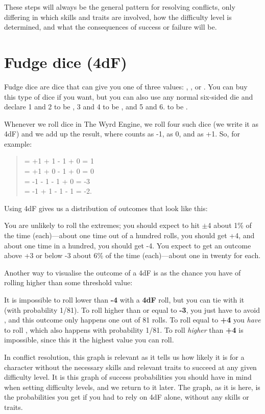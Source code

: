 These steps will always be the general pattern for resolving conflicts, only differing in which skills and traits are involved, how the difficulty level is determined, and what the consequences of success or failure will be.

\section{Fudge dice (4dF)}\label{core:fudge-dice}

Fudge dice are dice that can give you one of three values: \FudgeDie{-}, \FudgeDie{}, or \FudgeDie{+}. You can buy this type of dice if you want, but you can also use any normal six-sided die and declare 1 and 2 to be \FudgeDie{-}, 3 and 4 to be \FudgeDie{}, and 5 and 6. to be \FudgeDie{+}.

Whenever we roll dice in The Wyrd Engine, we roll four such dice (we write it as 4dF) and we add up the result, where \FudgeDie{-} counts as -1, \FudgeDie{} as 0, and \FudgeDie{+} as +1. So, for example:
\begin{quote}
	 = +1 + 1 - 1 + 0 = 1 \\
	 = +1 + 0 - 1 + 0 = 0 \\
	 = -1 - 1 - 1 + 0 = -3 \\
	\FudgeRes{-+--} = -1 + 1 - 1 - 1 = -2.
\end{quote}

\noindent
Using 4dF gives us a distribution of outcomes that look like this:

You are unlikely to roll the extremes; you should expect to hit $\pm$4 about 1\% of the time (each)---about one time out of a hundred rolls, you should get +4, and about one time in a hundred, you should get -4. You expect to get an outcome above +3 or below -3 about 6\% of the time (each)---about one in twenty for each.

Another way to visualise the outcome of a 4dF is as the chance you have of rolling higher than some threshold value:


It is impossible to roll lower than \textbf{-4} with a \textbf{4dF} roll, but you can tie with it (with probability 1/81).
To roll higher than or equal to \textbf{-3}, you just have to avoid \FudgeRes{----}, and this outcome only happens one out of 81 rolls. To roll equal to \textbf{+4} you \emph{have} to roll \FudgeRes{++++}, which also happens with probability 1/81. To roll \emph{higher} than \textbf{+4} is impossible, since this it the highest value you can roll.

In conflict resolution, this graph is relevant as it tells us how likely it is for a character without the necessary skills and relevant traits to succeed at any given difficulty level. It is this graph of success probabilities you should have in mind when setting difficulty levels, and we return to it later. The graph, as it is here, is the probabilities you get if you had to rely on 4dF alone, without any skills or traits.

